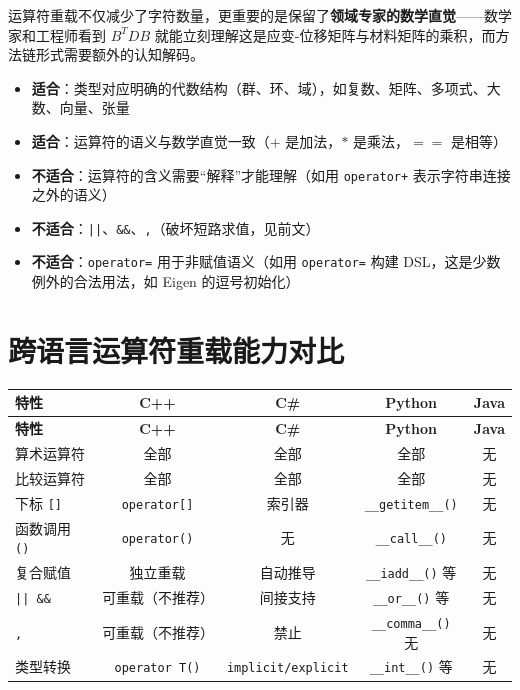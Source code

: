 \documentclass[12pt,a4paper,fontset=fandol]{ctexbook}
\newcommand{\Fn}[1]{\texttt{#1()}}
\newcommand{\Op}[1]{\texttt{operator#1}}
\begin{document}
运算符重载不仅减少了字符数量，更重要的是保留了\textbf{领域专家的数学直觉}——数学家和工程师看到 $B^T D B$ 就能立刻理解这是应变-位移矩阵与材料矩阵的乘积，而方法链形式需要额外的认知解码。

\begin{bestpractice}[title=何时使用运算符重载]
\begin{itemize}
  \item \textbf{适合}：类型对应明确的代数结构（群、环、域），如复数、矩阵、多项式、大数、向量、张量
  \item \textbf{适合}：运算符的语义与数学直觉一致（$+$ 是加法，$*$ 是乘法，$==$ 是相等）
  \item \textbf{不适合}：运算符的含义需要``解释''才能理解（如用 \Op{+} 表示字符串连接之外的语义）
  \item \textbf{不适合}：\texttt{||}、\texttt{\&\&}、\texttt{,}（破坏短路求值，见前文）
  \item \textbf{不适合}：\Op{=} 用于非赋值语义（如用 \Op{=} 构建 DSL，这是少数例外的合法用法，如 Eigen 的逗号初始化）
\end{itemize}
\end{bestpractice}

\section{跨语言运算符重载能力对比}

\begin{longtable}{lcccc}
\toprule
\textbf{特性} & \textbf{C++} & \textbf{C\#} & \textbf{Python} & \textbf{Java} \\
\midrule
\endfirsthead
\toprule
\textbf{特性} & \textbf{C++} & \textbf{C\#} & \textbf{Python} & \textbf{Java} \\
\midrule
\endhead
\bottomrule
\endfoot

算术运算符 & 全部 & 全部 & 全部 & 无 \\
比较运算符 & 全部 & 全部 & 全部 & 无 \\
下标 \texttt{[]} & \Op{[]} & 索引器 & \Fn{\_\_getitem\_\_} & 无 \\
函数调用 \texttt{()} & \Op{()} & 无 & \Fn{\_\_call\_\_} & 无 \\
复合赋值 & 独立重载 & 自动推导 & \Fn{\_\_iadd\_\_} 等 & 无 \\
\texttt{|| \&\&} & 可重载（不推荐） & 间接支持 & \Fn{\_\_or\_\_} 等 & 无 \\
\texttt{,} & 可重载（不推荐） & 禁止 & \Fn{\_\_comma\_\_} 无 & 无 \\
类型转换 & \texttt{operator T()} & \texttt{implicit/explicit} & \Fn{\_\_int\_\_} 等 & 无 \\
\bottomrule
\end{longtable}
\end{document}
